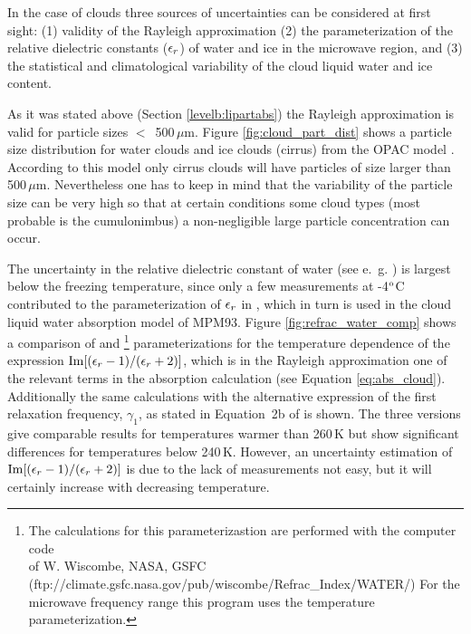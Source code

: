 {
\label{levelb:ref_uncert_clouds}
In the case of clouds three sources of uncertainties can be considered
at first sight: (1) validity of the Rayleigh approximation (2) the 
parameterization of the relative dielectric constants ($\epsilon_r$) of water 
and ice in the microwave region, and (3) the statistical and
climatological variability of the cloud liquid water and ice content.

As it was stated above (Section \ref{levelb:lipartabs}) the Rayleigh 
approximation is valid for particle sizes $<$~500\,$\mu$m. Figure 
\ref{fig:cloud_part_dist} shows a particle size distribution for water
clouds and ice clouds (cirrus) from the OPAC model \citep{hess:98}. 
According to this model only cirrus clouds will have particles of size
larger than 500\,$\mu$m. Nevertheless one has to keep in mind that the
variability of the particle size can be very high so that at certain 
conditions some cloud types (most probable is the cumulonimbus) 
a non-negligible large particle concentration can occur.

The uncertainty in the relative dielectric constant of water 
(see e.~g. \citet{liptonetal:99}) is largest below the freezing 
temperature, since only a few measurements at -4$^{\rm o}$C 
contributed to the parameterization of $\epsilon_r$ in \cite{liebeetal:91}, 
which in turn is used in the cloud liquid water absorption model of MPM93. 
Figure \ref{fig:refrac_water_comp} shows a comparison of 
\cite{liebeetal:91} and \cite{ray:72}\footnote{{The calculations
  for this parameterizastion are performed with the computer code}\\{
   of W. Wiscombe, NASA, GSFC}\\
  (ftp://climate.gsfc.nasa.gov/pub/wiscombe/Refrac\_Index/WATER/)
  For the microwave frequency range this program uses the
  \cite{ray:72} temperature parameterization.} parameterizations 
for the temperature dependence of the expression
$\mathrm{Im}{[(\epsilon_r-1)/(\epsilon_r+2)]}$, which is in the Rayleigh approximation 
one of the relevant terms in the absorption calculation (see 
Equation \ref{eq:abs_cloud}). Additionally the same calculations with 
the alternative expression of the first  relaxation frequency, 
$\gamma_1$, as stated in Equation~2b of \cite{liebeetal:91} is shown. 
The three versions give comparable results for temperatures warmer 
than 260\,K but show significant  differences for temperatures below 
240\,K. However, an uncertainty estimation of $\mathrm{Im}{[(\epsilon_r-1)/(\epsilon_r+2)]}$ 
is due to the lack of measurements not easy, but it will certainly
increase with decreasing temperature.

}
